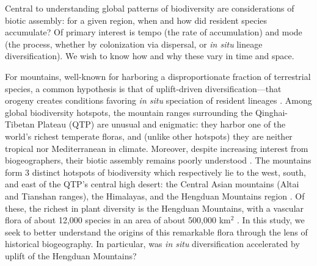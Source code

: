 

Central to understanding global patterns of biodiversity are
considerations of biotic assembly: for a given region, when and how
did resident species accumulate? Of primary interest is tempo (the
rate of accumulation) and mode (the process, whether by colonization
via dispersal, or \textit{in situ} lineage diversification). We wish
to know how and why these vary in time and space.

For mountains, well-known for harboring a disproportionate fraction of
terrestrial species, a common hypothesis is that of uplift-driven
diversification---that orogeny creates conditions favoring \textit{in
  situ} speciation of resident lineages
\citep{Hoorn2013,hughes2016,Wen2014,Favre2015,Lagomarsino2016,schwery2015}. Among
global biodiversity hotspots, the mountain ranges surrounding the
Qinghai-Tibetan Plateau (QTP) are unusual and enigmatic: they harbor
one of the world's richest temperate floras, and (unlike other
hotspots) they are neither tropical nor Mediterranean in
climate. Moreover, despite increasing interest from biogeographers,
their biotic assembly remains poorly understood
\citep{Favre2015,Wen2014,Hughes2015}. The mountains form 3 distinct
hotspots of biodiversity which respectively lie to the west, south,
and east of the QTP's central high desert: the Central Asian mountains
(Altai and Tianshan ranges), the Himalayas, and the Hengduan Mountains
region \citep{Favre2015}. Of these, the richest in plant diversity is
the Hengduan Mountains, with a vascular flora of about 12,000 species
in an area of about 500,000 km$^2$
\citep{Boufford2014,LiEtLi1993,Wu1988}. In this study, we seek to
better understand the origins of this remarkable flora through the
lens of historical biogeography. In particular, was \textit{in situ}
diversification accelerated by uplift of the Hengduan Mountains?


